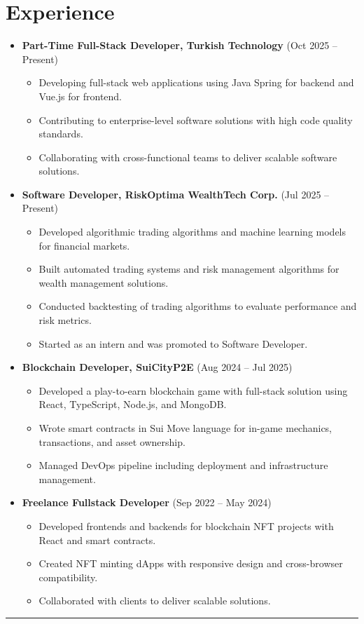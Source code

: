 \documentclass{article}
\begin{document}
\section*{Experience}
\vspace{-0.3em}
\begin{itemize}
    \item \textbf{Part-Time Full-Stack Developer, Turkish Technology} (Oct 2025 -- Present)
    \begin{itemize}
        \item Developing full-stack web applications using Java Spring for backend and Vue.js for frontend.
        \item Contributing to enterprise-level software solutions with high code quality standards.
        \item Collaborating with cross-functional teams to deliver scalable software solutions.
    \end{itemize}
    \item \textbf{Software Developer, RiskOptima WealthTech Corp.} (Jul 2025 -- Present)
    \begin{itemize}
        \item Developed algorithmic trading algorithms and machine learning models for financial markets.
        \item Built automated trading systems and risk management algorithms for wealth management solutions.
        \item Conducted backtesting of trading algorithms to evaluate performance and risk metrics.
        \item Started as an intern and was promoted to Software Developer.
    \end{itemize}
    \item \textbf{Blockchain Developer, SuiCityP2E} (Aug 2024 -- Jul 2025)
    \begin{itemize}
        \item Developed a play-to-earn blockchain game with full-stack solution using React, TypeScript, Node.js, and MongoDB.
        \item Wrote smart contracts in Sui Move language for in-game mechanics, transactions, and asset ownership.
        \item Managed DevOps pipeline including deployment and infrastructure management.
    \end{itemize}
    \item \textbf{Freelance Fullstack Developer} (Sep 2022 -- May 2024)
    \begin{itemize}
        \item Developed frontends and backends for blockchain NFT projects with React and smart contracts.
        \item Created NFT minting dApps with responsive design and cross-browser compatibility.
        \item Collaborated with clients to deliver scalable solutions.
    \end{itemize}
\end{itemize}
\hrule
\vspace{0.3em}
\end{document}
